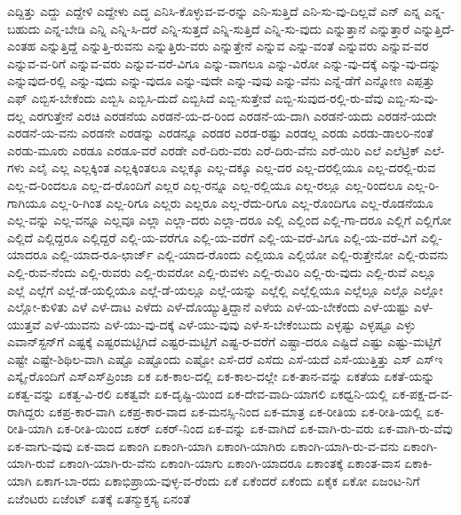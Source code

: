{ಎದ್ದಿತ್ತು
ಎದ್ದು
ಎದ್ದೇಳಿ
ಎದ್ದೇಳು
ಎದ್ಧ
ಎನಿಸಿ-ಕೊಳ್ಳುವ-ವ-ರನ್ನು
ಎನಿ-ಸುತ್ತಿದೆ
ಎನಿ-ಸು-ವು-ದಿಲ್ಲವೆ
ಎನ್
ಎನ್ನ
ಎನ್ನ-ಬಹುದು
ಎನ್ನ-ಬೇಡಿ
ಎನ್ನಿ
ಎನ್ನಿ-ಸಿ-ದರೆ
ಎನ್ನಿ-ಸುತ್ತದೆ
ಎನ್ನಿ-ಸುತ್ತಿದೆ
ಎನ್ನಿ-ಸು-ವುದು
ಎನ್ನುತ್ತಾನೆ
ಎನ್ನುತ್ತಾರೆ
ಎನ್ನುತ್ತಿದೆ-ಎಂತಹ
ಎನ್ನುತ್ತಿದ್ದೆ
ಎನ್ನುತ್ತಿ-ರುವನು
ಎನ್ನುತ್ತಿರು-ವರು
ಎನ್ನುತ್ತೇನೆ
ಎನ್ನುವ
ಎನ್ನು-ವಂತೆ
ಎನ್ನುವರು
ಎನ್ನುವ-ವರ
ಎನ್ನುವ-ವ-ರಿಗೆ
ಎನ್ನುವ-ವರು
ಎನ್ನುವ-ವರೆ-ವಿಗೂ
ಎನ್ನು-ವಾಗಲೂ
ಎನ್ನು-ವಿರೋ
ಎನ್ನು-ವು-ದಕ್ಕೆ
ಎನ್ನು-ವು-ದನ್ನು
ಎನ್ನುವುದ-ರಲ್ಲಿ
ಎನ್ನು-ವುದು
ಎನ್ನು-ವುದೂ
ಎನ್ನು-ವುದೇ
ಎನ್ನು-ವುವು
ಎನ್ನು-ವೆನು
ಎನ್ನೆ-ಡೆಗೆ
ಎನ್ನೋಣ
ಎಪ್ಪತ್ತು
ಎಫ್
ಎಬ್ಬಿಸ-ಬೇಕೆಂದು
ಎಬ್ಬಿಸಿ
ಎಬ್ಬಿಸಿ-ದುದೆ
ಎಬ್ಬಿಸಿದೆ
ಎಬ್ಬಿ-ಸುತ್ತೇವೆ
ಎಬ್ಬಿ-ಸುವುದ-ರಲ್ಲಿ-ರು-ವೆವು
ಎಬ್ಬಿ-ಸು-ವು-ದಲ್ಲ
ಎರಗುತ್ತೇನೆ
ಎರಚಿ
ಎರಡನೆಯ
ಎರಡನೆ-ಯ-ದ-ರಿಂದ
ಎರಡನೆ-ಯ-ದಾಗಿ
ಎರಡನೆ-ಯದು
ಎರಡನೆ-ಯದೇ
ಎರಡನೆ-ಯ-ವನು
ಎರಡನೇ
ಎರಡನ್ನು
ಎರಡನ್ನೂ
ಎರಡರ
ಎರಡ-ರಷ್ಟು
ಎರಡಲ್ಲ
ಎರಡು
ಎರಡು-ಡಾಲರಿ-ನಂತೆ
ಎರಡು-ಮೂರು
ಎರಡೂ
ಎರಡೂ-ವರೆ
ಎರಡೇ
ಎರೆ-ದಿರು-ವರು
ಎರೆ-ದಿರು-ವೆನು
ಎರೆ-ಯಿರಿ
ಎಲೆ
ಎಲೆಟ್ರಿಕ್
ಎಲೆ-ಗಳು
ಎಲೈ
ಎಲ್ಲ
ಎಲ್ಲಕ್ಕಿಂತ
ಎಲ್ಲಕ್ಕಿಂತಲೂ
ಎಲ್ಲಕ್ಕೂ
ಎಲ್ಲ-ದಕ್ಕೂ
ಎಲ್ಲ-ದರ
ಎಲ್ಲ-ದರಲ್ಲಿಯೂ
ಎಲ್ಲ-ದರಲ್ಲಿ-ರುವ
ಎಲ್ಲ-ದ-ರಿಂದಲೂ
ಎಲ್ಲ-ದ-ರೊಂದಿಗೆ
ಎಲ್ಲರ
ಎಲ್ಲ-ರನ್ನೂ
ಎಲ್ಲ-ರಲ್ಲಿಯೂ
ಎಲ್ಲ-ರಲ್ಲೂ
ಎಲ್ಲ-ರಿಂದಲೂ
ಎಲ್ಲ-ರಿ-ಗಾಗಿಯೂ
ಎಲ್ಲ-ರಿ-ಗಿಂತ
ಎಲ್ಲ-ರಿಗೂ
ಎಲ್ಲರು
ಎಲ್ಲರೂ
ಎಲ್ಲ-ರೆದು-ರಿಗೂ
ಎಲ್ಲ-ರೊಂದಿಗೂ
ಎಲ್ಲ-ರೊಡನೆಯೂ
ಎಲ್ಲ-ವನ್ನು
ಎಲ್ಲ-ವನ್ನೂ
ಎಲ್ಲವೂ
ಎಲ್ಲಾ
ಎಲ್ಲಾ-ದರು
ಎಲ್ಲಾ-ದರೂ
ಎಲ್ಲಿ
ಎಲ್ಲಿಂದ
ಎಲ್ಲಿ-ಗಾ-ದರೂ
ಎಲ್ಲಿಗೆ
ಎಲ್ಲಿಗೋ
ಎಲ್ಲಿದೆ
ಎಲ್ಲಿದ್ದರೂ
ಎಲ್ಲಿದ್ದರೆ
ಎಲ್ಲಿ-ಯ-ವರೆಗೂ
ಎಲ್ಲಿ-ಯ-ವರೆಗೆ
ಎಲ್ಲಿ-ಯ-ವರೆ-ವಿಗೂ
ಎಲ್ಲಿ-ಯ-ವರೆ-ವಿಗೆ
ಎಲ್ಲಿ-ಯಾದರೂ
ಎಲ್ಲಿ-ಯಾದ-ರೂ-ಛಾರ್ಜ್
ಎಲ್ಲಿ-ಯಾದ-ರೊಂದು
ಎಲ್ಲಿಯೂ
ಎಲ್ಲಿಯೋ
ಎಲ್ಲಿ-ರುತ್ತೇನೋ
ಎಲ್ಲಿ-ರುವನು
ಎಲ್ಲಿ-ರುವ-ನೆಂದು
ಎಲ್ಲಿ-ರುವರು
ಎಲ್ಲಿ-ರುವರೋ
ಎಲ್ಲಿ-ರುವಳು
ಎಲ್ಲಿ-ರುವಿರಿ
ಎಲ್ಲಿ-ರು-ವುದು
ಎಲ್ಲಿ-ರುವೆ
ಎಲ್ಲೂ
ಎಲ್ಲೆ
ಎಲ್ಲೆಗೆ
ಎಲ್ಲೆ-ಡೆ-ಯಲ್ಲಿಯೂ
ಎಲ್ಲೆ-ಡೆ-ಯಲ್ಲೂ
ಎಲ್ಲೆ-ಯನ್ನು
ಎಲ್ಲೆಲ್ಲಿ
ಎಲ್ಲೆಲ್ಲಿಯೂ
ಎಲ್ಲೆಲ್ಲೂ
ಎಲ್ಲೊ
ಎಲ್ಲೋ
ಎಲ್ಲೋ-ಕುಳಿತು
ಎಳೆ
ಎಳೆ-ದಾಟ
ಎಳೆದು
ಎಳೆ-ದೊಯ್ಯುತ್ತಿದ್ದಾನೆ
ಎಳೆಯ
ಎಳೆ-ಯ-ಬೇಕೆಂದು
ಎಳೆ-ಯಷ್ಟು
ಎಳೆ-ಯುತ್ತವೆ
ಎಳೆ-ಯುವನು
ಎಳೆ-ಯು-ವು-ದಕ್ಕೆ
ಎಳೆ-ಯು-ವುವು
ಎಳೆ-ಸ-ಬೇಕೆಂಬುದು
ಎಳ್ಳಷ್ಟು
ಎಳ್ಳಷ್ಟೂ
ಎಳ್ಳು
ಎವಾನ್‌ಸ್ಟನ್‌ಗೆ
ಎಷ್ಟಕ್ಕೆ
ಎಷ್ಟರಮಟ್ಟಿಗಿದೆ
ಎಷ್ಟರ-ಮಟ್ಟಿಗೆ
ಎಷ್ಟ-ರ-ವರೆಗೆ
ಎಷ್ಟಾ-ದರೂ
ಎಷ್ಟಿದೆ
ಎಷ್ಟು
ಎಷ್ಟು-ಮಟ್ಟಿಗೆ
ಎಷ್ಟೇ
ಎಷ್ಟೇ-ಶಿಥಿಲ-ವಾಗಿ
ಎಷ್ಟೊ
ಎಷ್ಟೊಂದು
ಎಷ್ಟೋ
ಎಸೆ-ದರೆ
ಎಸೆದು
ಎಸೆ-ಯದೆ
ಎಸೆ-ಯುತ್ತಿತ್ತು
ಎಸ್
ಎಸ್ಇ
ಎಸ್ಕೈ-ರೊಂದಿಗೆ
ಎಸ್‌ಎಸ್‌ಪ್ರಿಂಜಾ
ಏಕ
ಏಕ-ಕಾಲ-ದಲ್ಲಿ
ಏಕ-ಕಾಲ-ದಲ್ಲೇ
ಏಕ-ತಾನ-ವನ್ನು
ಏಕತೆಯ
ಏಕತೆ-ಯನ್ನು
ಏಕತ್ವ-ವನ್ನು
ಏಕತ್ವ-ವಿ-ರಲಿ
ಏಕತ್ವವೇ
ಏಕ-ದೃಷ್ಟಿ-ಯಿಂದ
ಏಕ-ದೇವ-ವಾದಿ-ಯಾಗಲಿ
ಏಕಧ್ವನಿ-ಯಲ್ಲಿ
ಏಕ-ಪಕ್ಷ-ದ-ವ-ರಾಗಿದ್ದರು
ಏಕಪ್ರ-ಕಾರ-ವಾಗಿ
ಏಕಪ್ರ-ಕಾರ-ವಾದ
ಏಕ-ಮನಸ್ಸಿ-ನಿಂದ
ಏಕ-ಮಾತ್ರ
ಏಕ-ರೀತಿಯ
ಏಕ-ರೀತಿ-ಯಲ್ಲಿ
ಏಕ-ರೀತಿ-ಯಾಗಿ
ಏಕ-ರೀತಿ-ಯಿಂದ
ಏಕರ್‌
ಏಕರ್‌-ನಿಂದ
ಏಕ-ವನ್ನು
ಏಕ-ವಾಗಿದೆ
ಏಕ-ವಾಗಿ-ರು-ವರು
ಏಕ-ವಾಗಿ-ರು-ವೆವು
ಏಕ-ವಾಗು-ವುವು
ಏಕ-ವಾದ
ಏಕಾಂಗಿ
ಏಕಾಂಗಿ-ಯಾಗಿ
ಏಕಾಂಗಿ-ಯಾಗಿರು
ಏಕಾಂಗಿ-ಯಾಗಿ-ರು-ವ-ವನು
ಏಕಾಂಗಿ-ಯಾಗಿ-ರುವೆ
ಏಕಾಂಗಿ-ಯಾಗಿ-ರು-ವೆನು
ಏಕಾಂಗಿ-ಯಾಗು
ಏಕಾಂಗಿ-ಯಾದರೂ
ಏಕಾಂತಕ್ಕೆ
ಏಕಾಂತ-ವಾಸ
ಏಕಾಕಿ-ಯಾಗಿ
ಏಕಾಗ-ಬಾ-ರದು
ಏಕಾಭಿಪ್ರಾಯ-ವುಳ್ಳ-ವ-ರೆಂದು
ಏಕೆ
ಏಕೆಂದರೆ
ಏಕೆಂದು
ಏಕೈಕ
ಏಕೋ
ಏಜಂಟ-ನಿಗೆ
ಏಜೆಂಟರು
ಏಜೆಂಟ್
ಏತಕ್ಕೆ
ಏತನ್ಮುಕ್ತಸ್ಯ
ಏನಂತೆ
}
